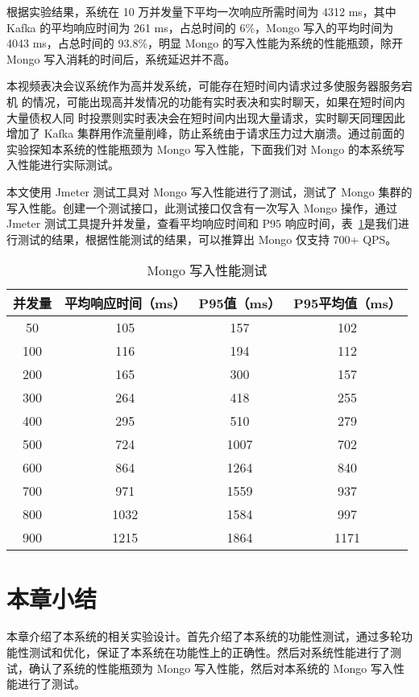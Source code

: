   根据实验结果，系统在 10 万并发量下平均一次响应所需时间为 4312 ms，其中 Kafka 的平均响应时间为 261 ms，占总时间的 6\%，Mongo 写入的平均时间为 4043 ms，占总时间的 93.8\%，明显 Mongo 的写入性能为系统的性能瓶颈，除开 Mongo 写入消耗的时间后，系统延迟并不高。

  本视频表决会议系统作为高并发系统，可能存在短时间内请求过多使服务器服务宕机
的情况，可能出现高并发情况的功能有实时表决和实时聊天，如果在短时间内大量债权人同
时投票则实时表决会在短时间内出现大量请求，实时聊天同理因此增加了 Kafka 集群用作流量削峰，防止系统由于请求压力过大崩溃。通过前面的实验探知本系统的性能瓶颈为 Mongo 写入性能，下面我们对 Mongo 的本系统写入性能进行实际测试。

本文使用 Jmeter 测试工具对 Mongo 写入性能进行了测试，测试了 Mongo 集群的写入性能。创建一个测试接口，此测试接口仅含有一次写入 Mongo 操作，通过 Jmeter 测试工具提升并发量，查看平均响应时间和 P95 响应时间，表~\ref{fig:test5}是我们进行测试的结果，根据性能测试的结果，可以推算出 Mongo 仅支持 700+ QPS。
  \begin{table}[h!]
    \begin{center}
      \caption{Mongo 写入性能测试}
      \label{fig:test5}
      \begin{tabular}{ c c c c }
        \hline
        \textbf{并发量} & \textbf{平均响应时间（ms）
        } & \textbf{P95值（ms）
        } & \textbf{P95平均值（ms）
        } \\
        \hline
        50 & 105 & 157 & 102 \\
        100 & 116 & 194 & 112 \\
        200 & 165 & 300 & 157 \\
        300 & 264 & 418 & 255 \\
        400 & 295 & 510 & 279 \\
        500 & 724 & 1007 & 702 \\
        600 & 864 & 1264 & 840 \\
        700 & 971 & 1559 & 937 \\
        800 & 1032 & 1584 & 997 \\
        900 & 1215 & 1864 & 1171 \\
        \hline
      \end{tabular}
    \end{center}
  \end{table}

  \section{本章小结}
  本章介绍了本系统的相关实验设计。首先介绍了本系统的功能性测试，通过多轮功能性测试和优化，保证了本系统在功能性上的正确性。然后对系统性能进行了测试，确认了系统的性能瓶颈为 Mongo 写入性能，然后对本系统的 Mongo 写入性能进行了测试。
